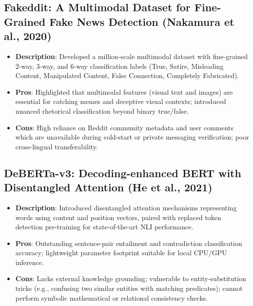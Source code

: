 \documentclass[12pt,a4paper]{report}
\begin{document}
\subsection{Fakeddit: A Multimodal Dataset for Fine-Grained Fake News Detection (Nakamura et al., 2020)}
\begin{itemize}
    \item \textbf{Description}: Developed a million-scale multimodal dataset with fine-grained 2-way, 3-way, and 6-way classification labels (True, Satire, Misleading Content, Manipulated Content, False Connection, Completely Fabricated).
    \item \textbf{Pros}: Highlighted that multimodal features (visual text and images) are essential for catching memes and deceptive visual contexts; introduced nuanced rhetorical classification beyond binary true/false.
    \item \textbf{Cons}: High reliance on Reddit community metadata and user comments which are unavailable during cold-start or private messaging verification; poor cross-lingual transferability.
\end{itemize}

\subsection{DeBERTa-v3: Decoding-enhanced BERT with Disentangled Attention (He et al., 2021)}
\begin{itemize}
    \item \textbf{Description}: Introduced disentangled attention mechanisms representing words using content and position vectors, paired with replaced token detection pre-training for state-of-the-art NLI performance.
    \item \textbf{Pros}: Outstanding sentence-pair entailment and contradiction classification accuracy; lightweight parameter footprint suitable for local CPU/GPU inference.
    \item \textbf{Cons}: Lacks external knowledge grounding; vulnerable to entity-substitution tricks (e.g., confusing two similar entities with matching predicates); cannot perform symbolic mathematical or relational consistency checks.
\end{itemize}
\end{document}
